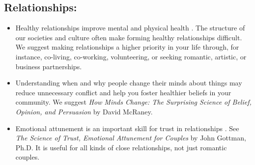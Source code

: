 \documentclass[12pt,letterpaper]{book}
\begin{document}
\subsection*{Relationships:}
\begin{itemize}
   \item Healthy relationships improve mental and physical health \cite{holt-lunstadRelationships}. The structure of our societies and culture often make forming healthy relationships difficult. We suggest making relationships a higher priority in your life through, for instance, co-living, co-working, volunteering, or seeking romantic, artistic, or business partnerships.  
   \item Understanding when and why people change their minds about things may reduce unnecessary conflict and help you foster healthier beliefs in your community. We suggest \textit{How Minds Change: The Surprising Science of Belief, Opinion, and Persuasion} by David McRaney.
   \item Emotional attunement is an important skill for trust in relationships \cite{gottmanTrust}. See \textit{The Science of Trust, Emotional Attunement for Couples} by John Gottman, Ph.D. It is useful for all kinds of close relationships, not just romantic couples.

\end{itemize}
\end{document}
